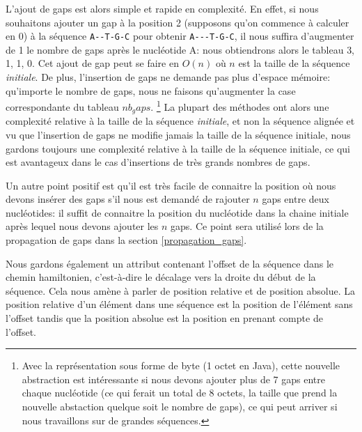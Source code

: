 L'ajout de gaps est alors simple et rapide en complexité. En effet,
si nous souhaitons ajouter un gap à la position 2 (supposons qu'on commence à
calculer en 0) à la séquence \verb|A--T-G-C| pour obtenir \verb|A---T-G-C|, il
nous suffira d'augmenter de 1 le nombre de gaps après le nucléotide A: nous
obtiendrons alors le tableau {3, 1, 1, 0}. Cet ajout de gap peut se faire en
$O(n)$ où $n$ est la taille de la séquence \textit{initiale}. De plus,
l'insertion de gaps ne demande pas plus d'espace mémoire: qu'importe le nombre
de gaps, nous ne faisons qu'augmenter la case
correspondante du tableau \emph{$nb_gaps$}. \footnote{Avec la représentation sous
	forme de byte (1 octet en Java), cette nouvelle abstraction est intéressante
si nous devons ajouter plus de 7 gaps entre chaque nucléotide (ce qui ferait un
total de 8 octets, la taille que prend la nouvelle abstaction quelque soit le
nombre de gaps), ce qui peut
arriver si nous travaillons sur de grandes séquences.} La plupart des méthodes
ont alors une complexité relative à la taille de la
séquence \textit{initiale}, et non la séquence alignée et vu que l'insertion de
gaps ne modifie jamais la taille de la séquence initiale, nous
gardons toujours une complexité relative à la taille de la séquence initiale, ce
qui est avantageux dans le cas d'insertions de très grands nombres de gaps.

Un autre point positif est qu'il est très facile de connaitre la position où nous
devons insérer des gaps s'il nous est demandé de rajouter $n$ gaps entre deux
nucléotides: il suffit de connaitre la position du nucléotide dans la chaine
initiale après lequel nous devons ajouter les $n$ gaps. Ce point sera utilisé
lors de la propagation de gaps dans la section \ref{propagation_gaps}.

Nous gardons également un attribut contenant l'offset de la séquence dans le
chemin hamiltonien, c'est-à-dire le décalage vers la droite du début de la
séquence. Cela nous amène à parler de position relative et de position absolue.
La position relative d'un élément dans une séquence est la position de l'élément
sans l'offset tandis que la position absolue est la position en prenant compte
de l'offset.

